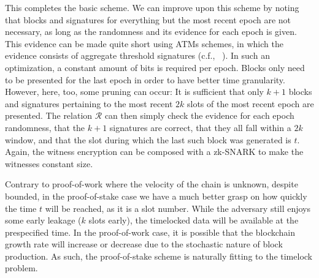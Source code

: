 This completes the basic scheme. We can improve upon this scheme by noting
that blocks and signatures for everything but the most recent epoch
are not necessary, as long as the randomness and its evidence for each epoch is
given. This evidence can be made quite short using ATMs schemes, in which the
evidence consists of aggregate threshold signatures
(c.f., ~\cite{pos-sidechains}). In such an optimization, a constant amount of bits
is required per epoch. Blocks only need to be presented for the last
epoch in order to have better time granularity. However, here, too, some pruning can
occur: It is sufficient that only $k+1$
blocks and signatures pertaining to the most recent $2k$ slots of the most recent epoch
are presented.
The relation $\mathcal{R}$ can then simply check the evidence for each epoch randomness,
that the $k+1$ signatures are correct, that they all fall within a $2k$ window, and
that the slot during which the last such block was generated is $t$.
Again, the witness encryption can be composed with a zk-SNARK
to make the witnesses constant size.

Contrary to proof-of-work where the velocity of the chain is unknown, despite bounded,
in the proof-of-stake case we have a much better grasp on how quickly the time $t$
will be reached, as it is a slot number. While the adversary still enjoys some early
leakage ($k$ slots early), the timelocked data will be available at the prespecified time.
In the proof-of-work case, it is possible that the blockchain growth rate will
increase or decrease due to the stochastic nature of block production. As such, the
proof-of-stake scheme is naturally fitting to the timelock problem.
